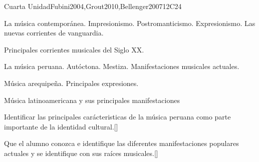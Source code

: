 \begin{syllabus}
\begin{unit}{}{Cuarta Unidad}{Fubini2004,Grout2010,Bellenger2007}{12}{C24}
\begin{topics}
	\item La música contemporánea.
		\subitem Impresionismo.
		\subitem Postromanticismo.
		\subitem Expresionismo.
		\subitem Las nuevas corrientes de vanguardia.
	\item Principales corrientes musicales del Siglo XX.
	\item La música peruana.
		\subitem Autóctona.
		\subitem Mestiza.
		\subitem Manifestaciones musicales actuales.
	\item Música arequipeña.
		\subitem Principales expresiones.
	\item Música latinoamericana y sus principales manifestaciones
\end{topics}
\begin{learningoutcomes}
	\item Identificar las principales carácteristicas de la música peruana como parte importante de la identidad cultural.[\Usage]
	\item Que el alumno conozca e identifique las diferentes manifestaciones populares actuales y se identifique con sus raíces musicales.[\Usage]
\end{learningoutcomes}
\end{unit}

\begin{coursebibliography}
\end{coursebibliography}

\end{syllabus}
